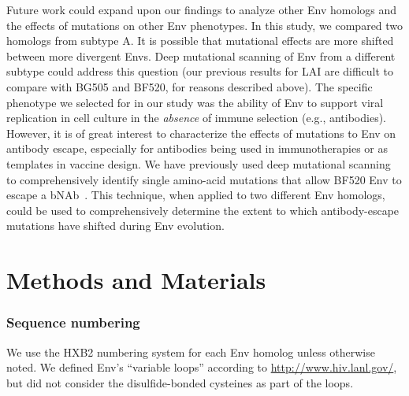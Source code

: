 \documentclass[9pt]{elife}
\begin{document}
Future work could expand upon our findings to analyze other Env homologs and the effects of mutations on other Env phenotypes.
In this study, we compared two homologs from subtype A.
It is possible that mutational effects are more shifted between more divergent Envs.
Deep mutational scanning of Env from a different subtype could address this question (our previous results for LAI are difficult to compare with BG505 and BF520, for reasons described above).
The specific phenotype we selected for in our study was the ability of Env to support viral replication in cell culture in the \textit{absence} of immune selection (e.g., antibodies).
However, it is of great interest to characterize the effects of mutations to Env on antibody escape, especially for antibodies being used in immunotherapies or as templates in vaccine design.
We have previously used deep mutational scanning to comprehensively identify single amino-acid mutations that allow BF520 Env to escape a bNAb~\cite{dingens2017comprehensive}.
This technique, when applied to two different Env homologs, could be used to comprehensively determine the extent to which antibody-escape mutations have shifted during Env evolution.


\section{Methods and Materials}

\subsubsection*{Sequence numbering}
We use the HXB2 numbering system \cite{korber1998numbering} for each Env homolog unless otherwise noted.
We defined Env's ``variable loops'' according to \url{http://www.hiv.lanl.gov/}, but did not consider the disulfide-bonded cysteines as part of the loops.
\end{document}

